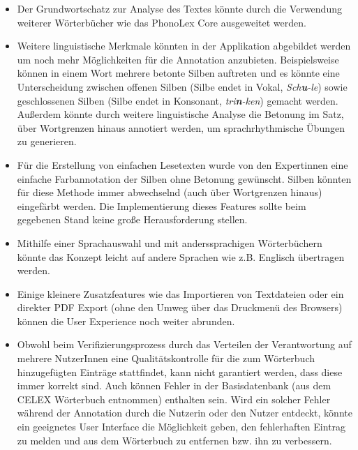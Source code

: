 \begin{itemize}
	\item Der Grundwortschatz zur Analyse des Textes könnte durch die Verwendung weiterer Wörterbücher wie das PhonoLex Core ausgeweitet werden.
	
	\item Weitere linguistische Merkmale könnten in der Applikation abgebildet werden um noch mehr Möglichkeiten für die Annotation anzubieten. Beispielsweise können in einem Wort mehrere betonte Silben auftreten und es könnte eine Unterscheidung zwischen offenen Silben (Silbe endet in Vokal, \textit{Sch\textbf{u}-le}) sowie geschlossenen Silben (Silbe endet in Konsonant, \textit{tri\textbf{n}-ken}) gemacht werden. Außerdem könnte durch weitere linguistische Analyse die Betonung im Satz, über Wortgrenzen hinaus annotiert werden, um sprachrhythmische Übungen zu generieren.
	
	\item Für die Erstellung von einfachen Lesetexten wurde von den Expertinnen eine einfache Farbannotation der Silben ohne Betonung gewünscht. Silben könnten für diese Methode immer abwechselnd (auch über Wortgrenzen hinaus) eingefärbt werden. Die Implementierung dieses Features sollte beim gegebenen Stand keine große Herausforderung stellen.
	
	\item Mithilfe einer Sprachauswahl und mit anderssprachigen Wörterbüchern könnte das Konzept leicht auf andere Sprachen wie z.B. Englisch übertragen werden.
	
	\item Einige kleinere Zusatzfeatures wie das Importieren von Textdateien oder ein direkter PDF Export (ohne den Umweg über das Druckmenü des Browsers) können die User Experience noch weiter abrunden.
	
	\item Obwohl beim Verifizierungsprozess durch das Verteilen der Verantwortung auf mehrere NutzerInnen eine Qualitätskontrolle für die zum Wörterbuch hinzugefügten Einträge stattfindet, kann nicht garantiert werden, dass diese immer korrekt sind. Auch können Fehler in der Basisdatenbank (aus dem CELEX Wörterbuch entnommen) enthalten sein. Wird ein solcher Fehler während der Annotation durch die Nutzerin oder den Nutzer entdeckt, könnte ein geeignetes User Interface die Möglichkeit geben, den fehlerhaften Eintrag zu melden und aus dem Wörterbuch zu entfernen bzw. ihn zu verbessern.
\end{itemize}

